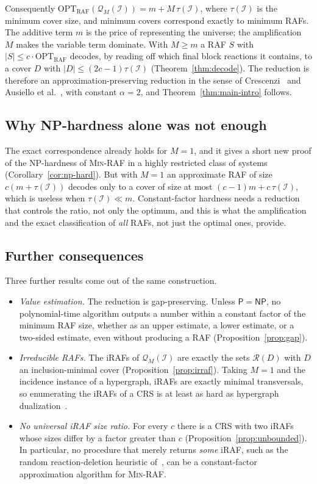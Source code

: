 \documentclass[11pt,a4paper]{article}
\theoremstyle{plain}
\theoremstyle{definition}
\theoremstyle{remark}
\newcommand{\OPT}{\mathrm{OPT}}
\newcommand{\RAF}{\mathrm{RAF}}
\newcommand{\optraf}{\OPT_{\RAF}}
\newcommand{\cQ}{\mathcal{Q}}
\newcommand{\cR}{\mathcal{R}}
\newcommand{\cI}{\mathcal{I}}
\newcommand{\tauI}{\tau(\cI)}
\newcommand{\MinRAF}{\textup{\textsc{Min-RAF}}}
\newcommand{\NP}{\mathsf{NP}}
\newcommand{\Ptime}{\mathsf{P}}
\begin{document}
Consequently $\optraf(\cQ_M(\cI))=m+M\,\tauI$, where $\tauI$ is the minimum cover size, and minimum covers correspond exactly to minimum RAFs. The additive term $m$ is the price of representing the universe; the amplification $M$ makes the variable term dominate. With $M\ge m$ a RAF $S$ with $|S|\le c\cdot\optraf$ decodes, by reading off which final block reactions it contains, to a cover $D$ with $|D|\le(2c-1)\tauI$ (Theorem~\ref{thm:decode}). The reduction is therefore an approximation-preserving reduction in the sense of Crescenzi~\cite{crescenzi1997short} and Ausiello et al.~\cite{ausiello1999complexity}, with constant $\alpha=2$, and Theorem~\ref{thm:main-intro} follows.

\subsection*{Why NP-hardness alone was not enough}

The exact correspondence already holds for $M=1$, and it gives a short new proof of the NP-hardness of \MinRAF{} in a highly restricted class of systems (Corollary~\ref{cor:np-hard}). But with $M=1$ an approximate RAF of size $c(m+\tauI)$ decodes only to a cover of size at most $(c-1)m+c\,\tauI$, which is useless when $\tauI\ll m$. Constant-factor hardness needs a reduction that controls the ratio, not only the optimum, and this is what the amplification and the exact classification of \emph{all} RAFs, not just the optimal ones, provide.

\subsection*{Further consequences}

Three further results come out of the same construction.

\begin{itemize}
\item \emph{Value estimation.} The reduction is gap-preserving. Unless $\Ptime=\NP$, no polynomial-time algorithm outputs a number within a constant factor of the minimum RAF size, whether as an upper estimate, a lower estimate, or a two-sided estimate, even without producing a RAF (Proposition~\ref{prop:gap}).
\item \emph{Irreducible RAFs.} The iRAFs of $\cQ_M(\cI)$ are exactly the sets $\cR(D)$ with $D$ an inclusion-minimal cover (Proposition~\ref{prop:irraf}). Taking $M=1$ and the incidence instance of a hypergraph, iRAFs are exactly minimal transversals, so enumerating the iRAFs of a CRS is at least as hard as hypergraph dualization~\cite{eiter1995identifying,fredman1996complexity}.
\item \emph{No universal iRAF size ratio.} For every $c$ there is a CRS with two iRAFs whose sizes differ by a factor greater than $c$ (Proposition~\ref{prop:unbounded}). In particular, no procedure that merely returns \emph{some} iRAF, such as the random reaction-deletion heuristic of~\cite{hordijk2015algorithms}, can be a constant-factor approximation algorithm for \MinRAF.
\end{itemize}
\end{document}
